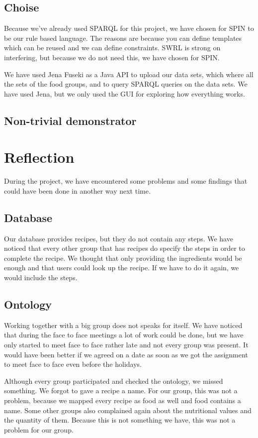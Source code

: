 \subsection*{Choise}
Because we've already used SPARQL for this project, we have chosen for SPIN to be our rule based language. The reasons are because you can define templates which can be reused and we can define constraints. SWRL is strong on interfering, but because we do not need this, we have chosen for SPIN.

We have used Jena Fuseki as a Java API to upload our data sets, which where all the sets of the food groups, and to query SPARQL queries on the data sets. We have used Jena, but we only used the GUI for exploring how everything works. 
\subsection{Non-trivial demonstrator}

\section{Reflection}
During the project, we have encountered some problems and some findings that could have been done in another way next time. 
\subsection*{Database} 
Our database provides recipes, but they do not contain any steps. We have noticed that every other group that has recipes do specify the steps in order to complete the recipe. We thought that only providing the ingredients would be enough and that users could look up the recipe. If we have to do it again, we would include the steps.
\subsection*{Ontology} 
Working together with a big group does not speaks for itself. We have noticed that during the face to face meetings a lot of work could be done, but we have only started to meet face to face rather late and not every group was present. It would have been better if we agreed on a date as soon as we got the assignment to meet face to face even before the holidays.  

Although every group participated and checked the ontology, we missed something. We forgot to gave a recipe a name. For our group, this was not a problem, because we mapped every recipe as food as well and food contains a name. Some other groups also complained again about the nutritional values and the quantity of them. Because this is not something we have, this was not a problem for our group. 

